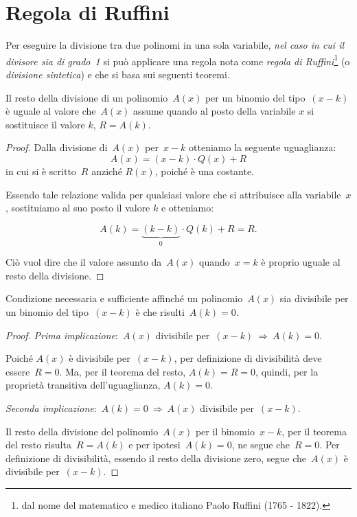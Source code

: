 \section{Regola di Ruffini}\label{sect:regola_di_Ruffini}

Per eseguire la divisione tra due polinomi in una sola variabile, \emph{nel caso in cui il
divisore sia di grado~1} si può applicare una regola nota come \emph{regola
di Ruffini}\footnote{dal nome del matematico e medico italiano Paolo Ruffini (1765 - 1822).} (o \emph{divisione sintetica}) e che si basa sui seguenti teoremi.

\begin{teorema}
 Il resto della divisione di un polinomio~$A(x)$ per un
binomio del tipo~$(x-k)$ è uguale al valore che~$A(x)$ assume quando
al posto della variabile $x$ si sostituisce il valore $k$, $R=A(k)$.
\end{teorema}

\begin{proof}
 Dalla divisione di~$A(x)$ per~$x-k$ otteniamo la seguente
uguaglianza:
\[A(x)=(x-k)\cdot Q(x)+R\]
in cui si è scritto~$R$ anziché $R(x)$, poiché è
una costante.

Essendo tale relazione valida per qualsiasi valore che si attribuisce
alla variabile~$x$, sostituiamo al suo posto il valore
$k$ e otteniamo:

\[A(k)=\underbrace{(k-k)}_{0}\cdot Q(k)+R=R.\]

Ciò vuol dire che il valore assunto da~$A(x)$
quando~$x=k$ è proprio uguale al resto della divisione.
\end{proof}

\begin{teorema}[di Ruffini]
 Condizione necessaria e sufficiente affinché un
polinomio~$A(x)$ sia divisibile per un binomio del tipo~$(x-k)$ è
che risulti~$A(k)=0$.
\end{teorema}

\begin{proof}
\emph{Prima implicazione}:~$A(x)$ divisibile per~$(x-k)\:\Rightarrow\: A(k)=0$.

Poiché $A(x)$ è divisibile per~$(x-k)$, per definizione di divisibilità deve essere~$R=0$. Ma, per il
teorema del resto, $A(k)=R=0$, quindi, per la proprietà transitiva
dell'uguaglianza, $A(k)=0$.

\emph{Seconda implicazione}:~$A(k)=0\:\Rightarrow\: A(x)$
divisibile per~$(x-k)$.

Il resto della divisione del polinomio~$A(x)$ per il binomio~$x-k$,
per il teorema del resto risulta~$R=A(k)$ e per ipotesi~$A(k)=0$,
ne segue che~$R=0$. Per definizione di divisibilità, essendo il
resto della divisione zero, segue che~$A(x)$ è divisibile per~$(x-k)$.
\end{proof}


